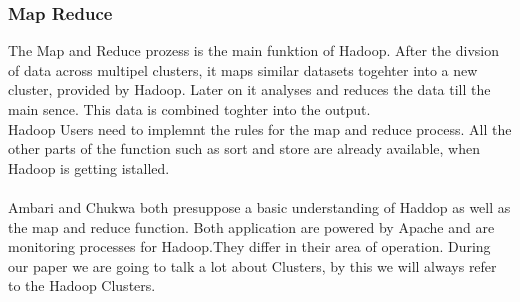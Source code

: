 \subsubsection*{Map Reduce}
The Map and Reduce prozess is the main funktion of Hadoop. After the divsion of data across multipel clusters, it maps similar datasets togehter into a new cluster, provided by Hadoop. Later on it analyses and reduces the data till the main sence. This data is combined toghter into the output.
\\
Hadoop Users need to implemnt the rules for the map and reduce process. All the other parts of the function such as sort and store are already available, when Hadoop is getting istalled.
\\
\\
Ambari and Chukwa both presuppose a basic understanding of Haddop as well as the map and reduce function. Both application are powered by Apache and are monitoring processes for Hadoop.They differ in their area of operation. During our paper we are going to talk a lot about Clusters, by this we will always refer to the Hadoop Clusters. 